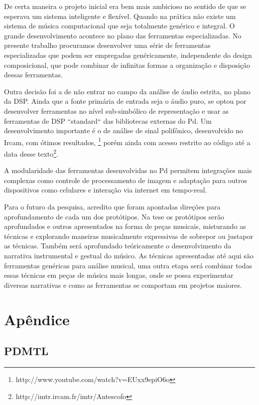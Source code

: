 \documentclass{ppgmus}
\begin{document}
De certa maneira o projeto inicial era bem mais ambicioso no sentido
de que se esperava um sistema inteligente e flexível. 
Quando na prática
não existe um sistema de música computacional que seja totalmente genérico
e integral. O grande desenvolvimento acontece no plano das ferramentas
especializadas. No presente trabalho procuramos desenvolver uma série
de ferramentas especializadas que podem ser empregadas genéricamente, independente
do design composicional, que pode combinar de infinitas formas a organização e 
disposição dessas ferramentas.  

Outra decisão foi a de não entrar no campo da análise de áudio estrita, no plano
da DSP. Ainda que a fonte primária de entrada seja o áudio puro, se optou por
desenvolver ferramentas no nível sub-simbólico de representação e usar as ferramentas
de DSP ``standard`` das bibliotecas externas do Pd. Um desenvolvimento importante
é o de análise de sinal polifônico, desenvolvido no Ircam, com ótimos resultados,
\footnote{http://www.youtube.com/watch?v=EUxx9epiO6o}
porém ainda com acesso restrito
ao código até a data desse texto\footnote{http://imtr.ircam.fr/imtr/Antescofo}.    


A modularidade das ferramentas desenvolvidas no Pd permitem
integrações mais complexas como controle de  processamento de imagem
e adaptação para outros dispositivos como celulares e interação via internet
em tempo-real.

Para o futuro da pesquisa, acredito que foram apontadas direções para aprofundamento
de cada um dos protótipos. Na tese os  protótipos serão aprofundados e 
outros apresentados na forma de peças musicais, misturando as técnicas e explorando 
maneiras musicalmente expressivas de
sobrepor ou justapor as técnicas. Também será aprofundado teóricamente o 
desenvolvimento da narrativa instrumental e gestual do músico. 
As técnicas apresentadas até aqui são ferramentas genéricas para análise musical,
uma outra etapa será combinar todas essas técnicas em peças de música mais longas,
onde se possa experimentar diversas narrativas e como as ferramentas se comportam
em projetos maiores.




 


\chapter{Apêndice}
\label{chap:anexos}


\section{PDMTL}
\label{pdmtl}
\end{document}
